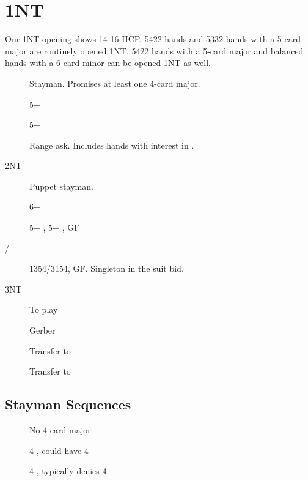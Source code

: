 \documentclass[tom-ari]{subfiles}
\begin{document}
\chapter{1NT}

Our 1NT opening shows 14-16 HCP. 5422 hands and 5332 hands with a 5-card major are routinely opened 1NT.
5422 hands with a 5-card major and balanced hands with a 6-card minor can be opened 1NT as well.

\begin{description}
  \item[] Stayman. Promises at least one 4-card major.
  \item[] 5+ \heartsuit
  \item[] 5+ \spadesuit
  \item[] Range ask. Includes hands with interest in \clubsuit.
  \item[2NT] Puppet stayman.
  \item[] 6+ \diamondsuit
  \item[] 5+ \diamondsuit, 5+ \clubsuit, GF
  \item[/] 1354/3154, GF. Singleton in the suit bid.
  \item[3NT] To play
  \item[] Gerber
  \item[] Transfer to \heartsuit
  \item[] Transfer to \spadesuit
\end{description}

\section{Stayman Sequences}

\begin{description}
  \item[] No 4-card major
  \item[] 4 \heartsuit, could have 4 \spadesuit
  \item[] 4 \spadesuit, typically denies 4 \heartsuit
\end{description}
\end{document}
